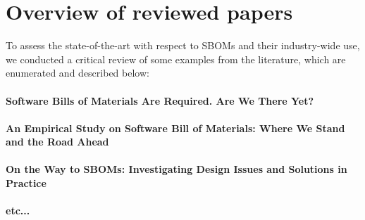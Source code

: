 \section{Overview of reviewed papers}

To assess the state-of-the-art with respect to SBOMs and their industry-wide use, we conducted a critical review of some examples from the literature, which are enumerated and described below:

\paragraph{Software Bills of Materials Are Required. Are We There Yet?} \cite{article:sbom-required}
\paragraph{An Empirical Study on Software Bill of Materials: Where We Stand and the Road Ahead} \cite{article:sbom-study}
\paragraph{On the Way to SBOMs: Investigating Design Issues and Solutions in Practice} \cite{article:sboms-issues-solutions}
\paragraph{etc...}